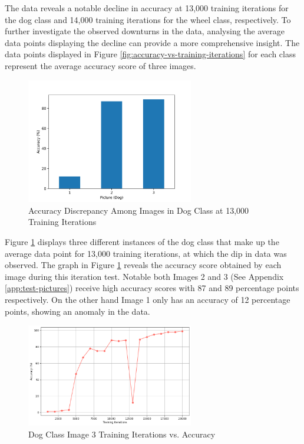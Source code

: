 The data reveals a notable decline in accuracy at 13,000 training iterations for the dog class and 14,000 training iterations for the wheel class, respectively. To further investigate the observed downturns in the data, analysing the average data points displaying the decline can provide a more comprehensive insight. The data points displayed in Figure \ref{fig:accuracy-vs-training-iterations} for each class represent the average accuracy score of three images. 
\begin{figure}[h!]
   \centering
   \includegraphics[width=0.65\textwidth]{../Data/dog-outliers.png}
   \caption{Accuracy Discrepancy Among Images in Dog Class at 13,000 Training Iterations}
   \label{fig:14000-dog}
\end{figure}
\newpage

Figure \ref{fig:14000-dog} displays three different instances of the dog class that make up the average data point for 13,000 training iterations, at which the dip in data was observed. The graph in Figure \ref{fig:14000-dog} reveals the accuracy score obtained by each image during this iteration test. Notable both Images 2 and 3 (See Appendix \ref{app:test-pictures}) receive high accuracy scores with 87 and 89 percentage points respectively. On the other hand Image 1 only has an accuracy of 12 percentage points, showing an anomaly in the data.

\begin{figure}[h!]
   \centering
   \includegraphics[width=0.65\textwidth]{../Data/dogs_image1_accuracy_vs_iteration.png}
   \caption{Dog Class Image 3 Training Iterations vs. Accuracy }
   \label{fig:image-1-accuracy}
\end{figure}

